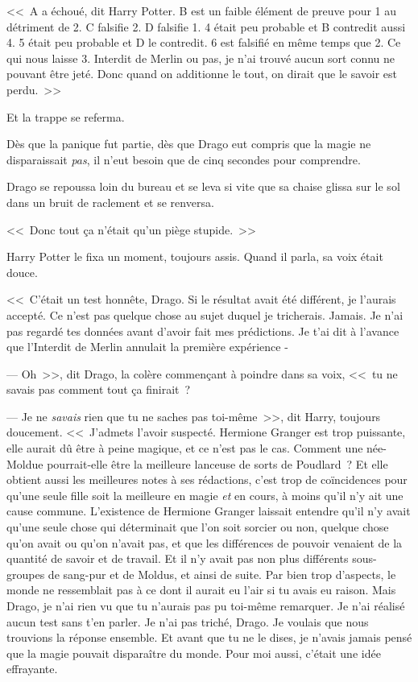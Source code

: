\baselineskip

\restoretrivseps

<<~A a échoué, dit Harry Potter. B est un faible élément de preuve pour 1 au détriment de 2. C falsifie 2. D falsifie 1. 4 était peu probable et B contredit aussi 4. 5 était peu probable et D le contredit. 6 est falsifié en même temps que 2. Ce qui nous laisse 3. Interdit de Merlin ou pas, je n'ai trouvé aucun sort connu ne pouvant être jeté. Donc quand on additionne le tout, on dirait que le savoir est perdu.~>>

Et la trappe se referma.

Dès que la panique fut partie, dès que Drago eut compris que la magie ne disparaissait \emph{pas}, il n'eut besoin que de cinq secondes pour comprendre.

Drago se repoussa loin du bureau et se leva si vite que sa chaise glissa sur le sol dans un bruit de raclement et se renversa.

<<~Donc tout ça n'était qu'un piège stupide.~>>

Harry Potter le fixa un moment, toujours assis. Quand il parla, sa voix était douce.

<<~C'était un test honnête, Drago. Si le résultat avait été différent, je l'aurais accepté. Ce n'est pas quelque chose au sujet duquel je tricherais. Jamais. Je n'ai pas regardé tes données avant d'avoir fait mes prédictions. Je t'ai dit à l'avance que l'Interdit de Merlin annulait la première expérience -

--- Oh~>>, dit Drago, la colère commençant à poindre dans sa voix, <<~tu ne savais pas comment tout ça finirait~?

--- Je ne \emph{savais} rien que tu ne saches pas toi-même~>>, dit Harry, toujours doucement. <<~J'admets l'avoir suspecté. Hermione Granger est trop puissante, elle aurait dû être à peine magique, et ce n'est pas le cas. Comment une née-Moldue pourrait-elle être la meilleure lanceuse de sorts de Poudlard~? Et elle obtient aussi les meilleures notes à ses rédactions, c'est trop de coïncidences pour qu'une seule fille soit la meilleure en magie \emph{et} en cours, à moins qu'il n'y ait une cause commune. L'existence de Hermione Granger laissait entendre qu'il n'y avait qu'une seule chose qui déterminait que l'on soit sorcier ou non, quelque chose qu'on avait ou qu'on n'avait pas, et que les différences de pouvoir venaient de la quantité de savoir et de travail. Et il n'y avait pas non plus différents sous-groupes de sang-pur et de Moldus, et ainsi de suite. Par bien trop d'aspects, le monde ne ressemblait pas à ce dont il aurait eu l'air si tu avais eu raison. Mais Drago, je n'ai rien vu que tu n'aurais pas pu toi-même remarquer. Je n'ai réalisé aucun test sans t'en parler. Je n'ai pas triché, Drago. Je voulais que nous trouvions la réponse ensemble. Et avant que tu ne le dises, je n'avais jamais pensé que la magie pouvait disparaître du monde. Pour moi aussi, c'était une idée effrayante.


